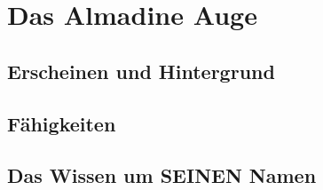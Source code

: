 \section{Das Almadine Auge}

\subsection{Erscheinen und Hintergrund}

\subsection{Fähigkeiten}

\subsection{Das Wissen um SEINEN Namen}